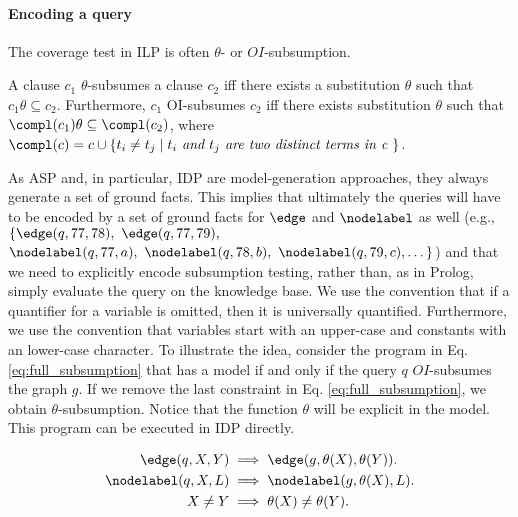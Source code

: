 \paragraph{Encoding a query}
The coverage test in ILP is often $\theta$- or  $OI$-subsumption.

\begin{definition}
  A clause $c_1$ $\theta$-subsumes a clause $c_2$ iff there exists a substitution $\theta$ such that $c_1 \theta \subseteq c_2$. 
Furthermore, $c_1$ 
  OI-subsumes $c_2$ iff there exists substitution $\theta$ such that $\compl(c_1) \theta \subseteq \compl(c_2)$, where $\compl(c) = c \cup \{ t_i \neq t_j \mid t_i \textit{ and } t_j \textit{ are two distinct terms in c }\}$.
\end{definition}
 
As ASP and, in particular, IDP are model-generation approaches, they always generate a set of ground facts. This implies that ultimately the queries will have to be encoded by a set of ground facts for $\edge$ and $\nodelabel$ as well (e.g., $\{ \edge(q,77,78),~ \edge(q,77,79),$ $\nodelabel(q,77,a),~ \nodelabel(q,78,b),~ \nodelabel(q,79,c),\dots \}$)
and that we need to explicitly encode subsumption testing, rather than, as in Prolog, simply evaluate the query on the knowledge base.  We use the convention that if a quantifier for a variable is omitted, then it is universally quantified. Furthermore, we use the convention that variables start with an upper-case and constants with an lower-case character. To illustrate the idea, consider the program in Eq. \ref{eq:full_subsumption} that has a model if and only if the query $q$ $OI$-subsumes the graph $g$.
If we remove the last constraint in Eq. \ref{eq:full_subsumption}, we obtain $\theta$-subsumption.
Notice that the function $\theta$ will be explicit in the model. 
This program can be executed in IDP directly.  

\begin{equation}
\begin{aligned}
  \edge(q,X,Y) &\implies \edge(g,\theta(X), \theta(Y)).  \\
  \nodelabel(q,X,L) &\implies \nodelabel(g,\theta(X),L) . \\
  X \neq Y &\implies \theta(X) \neq \theta(Y).
\end{aligned}
  \label{eq:full_subsumption}
\end{equation}

